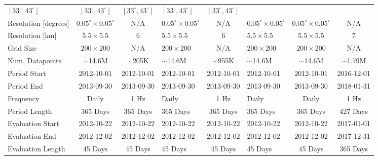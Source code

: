 \begin{landscape}
\begin{table}[ht]
\begin{tabular}{lcclclcc}
$[33^\circ, 43^\circ]$ &
$[33^\circ, 43^\circ]$ &
$[33^\circ, 43^\circ]$ &
$[33^\circ, 43^\circ]$ &
$[33^\circ, 43^\circ]$ \\
Resolution [degrees] &
$0.05^\circ\times 0.05^\circ$ &
N/A &
$0.05^\circ\times 0.05^\circ$ &
N/A &
$0.05^\circ\times 0.05^\circ$ &
$0.05^\circ\times 0.05^\circ$ &
N/A \\
Resolution [km] &
$5.5\times 5.5$ &
$6$ &
$5.5\times 5.5$ &
$6$ &
$5.5\times 5.5$ &
$5.5\times 5.5$ &
$7$ \\
Grid Size &
$200\times 200$ & 
N/A &
$200\times 200$ & 
N/A &
$200\times 200$ & 
$200\times 200$ & 
N/A \\
Num. Datapoints &
$\sim$14.6M & 
$\sim$205K & 
$\sim$14.6M & 
$\sim$955K & 
$\sim$14.6M & 
$\sim$14.6M & 
$\sim$1.79M \\ \midrule
Period Start & 
2012-10-01 & 2012-10-01 & 2012-10-01 & 2012-10-01 & 
2012-10-01 & 2012-10-01 & 2016-12-01 \\
Period End & 
2013-09-30 & 2013-09-30 & 2013-09-30 & 2013-09-30 & 
2013-09-30 & 2013-09-30 & 2018-01-31 \\
Frequency  & 
Daily & 1 Hz  & Daily & 1 Hz  & Daily & Daily & 1 Hz \\ 
Period Length & 365 Days & 365 Days & 365 Days &
365 Days & 365 Days & 365 Days & 427 Days \\
\midrule
Evaluation Start & 
2012-10-22 & 2012-10-22 & 2012-10-22 & 2012-10-22 & 
2012-10-22 & 2012-10-22 & 2017-01-01 \\
Evaluation End & 
2012-12-02 & 2012-12-02 & 2012-12-02 & 2012-12-02 & 
2012-12-02 & 2012-12-02 & 2017-12-31 \\ 
Evaluation Length & 45 Days & 45 Days & 45 Days &
45 Days & 45 Days & 45 Days & 365 Days \\
\bottomrule
\end{tabular}
\end{table}
\end{landscape}
